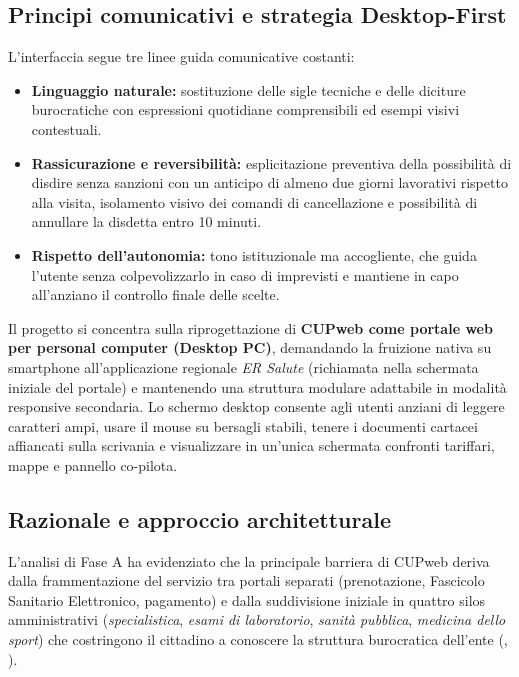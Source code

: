 \subsection{Principi comunicativi e strategia Desktop-First}

L'interfaccia segue tre linee guida comunicative costanti:
\begin{itemize}
\item \textbf{Linguaggio naturale:} sostituzione delle sigle tecniche e delle diciture burocratiche con espressioni quotidiane comprensibili ed esempi visivi contestuali.
\item \textbf{Rassicurazione e reversibilità:} esplicitazione preventiva della possibilità di disdire senza sanzioni con un anticipo di almeno due giorni lavorativi rispetto alla visita, isolamento visivo dei comandi di cancellazione e possibilità di annullare la disdetta entro 10 minuti.
\item \textbf{Rispetto dell'autonomia:} tono istituzionale ma accogliente, che guida l'utente senza colpevolizzarlo in caso di imprevisti e mantiene in capo all'anziano il controllo finale delle scelte.
\end{itemize}

Il progetto si concentra sulla riprogettazione di \textbf{CUPweb come portale web per personal computer (Desktop PC)}, demandando la fruizione nativa su smartphone all'applicazione regionale \emph{ER Salute} (richiamata nella schermata iniziale del portale) e mantenendo una struttura modulare adattabile in modalità responsive secondaria. Lo schermo desktop consente agli utenti anziani di leggere caratteri ampi, usare il mouse su bersagli stabili, tenere i documenti cartacei affiancati sulla scrivania e visualizzare in un'unica schermata confronti tariffari, mappe e pannello co-pilota.

\label{doc:c:02}

\subsection{Razionale e approccio architetturale}

L'analisi di Fase A ha evidenziato che la principale barriera di CUPweb deriva dalla frammentazione del servizio tra portali separati (prenotazione, Fascicolo Sanitario Elettronico, pagamento) e dalla suddivisione iniziale in quattro silos amministrativi (\emph{specialistica}, \emph{esami di laboratorio}, \emph{sanità pubblica}, \emph{medicina dello sport}) che costringono il cittadino a conoscere la struttura burocratica dell'ente (, ).

